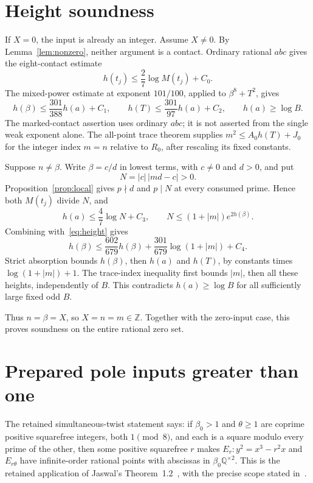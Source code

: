 \documentclass[11pt,a4paper]{article}
\newcommand{\Q}{\mathbb Q}\newcommand{\Z}{\mathbb Z}
\begin{document}
\section{Height soundness}
If $X=0$, the input is already an integer. Assume $X\ne0$.
By Lemma~\ref{lem:nonzero}, neither argument is a contact.
Ordinary rational $abc$ gives the eight-contact estimate
\cite[Section~2]{Height}
\[
                 h(t_j)\le\frac27\log M(t_j)+C_0.
\]
The mixed-power estimate at exponent $101/100$, applied to
$\beta^8+T^2$, gives
\begin{equation}\label{eq:height}
 h(\beta)\le\frac{301}{388}h(a)+C_1,\qquad
 h(T)\le\frac{301}{97}h(a)+C_2,\qquad h(a)\ge\log B.
\end{equation}
The marked-contact assertion uses ordinary $abc$; it is not asserted
from the single weak exponent alone. The all-point trace theorem
\cite[Corollary~1.3]{Trace}
supplies $m^2\le A_0h(T)+J_0$ for the integer index $m=n$
relative to $R_0$, after rescaling its fixed constants.

Suppose $n\ne\beta$. Write $\beta=c/d$ in lowest terms,
with $c\ne0$ and $d>0$, and put
\[
                         N=|c|\,|md-c|>0.
\]
Proposition~\ref{prop:local} gives $p\nmid d$ and $p\mid N$ at
every consumed prime. Hence both $M(t_j)$ divide $N$, and
\[
 h(a)\le\frac47\log N+C_3,\qquad
 N\le(1+|m|)e^{2h(\beta)}.
\]
Combining with~\eqref{eq:height} gives
\[
 h(\beta)\le\frac{602}{679}h(\beta)
       +\frac{301}{679}\log(1+|m|)+C_4.
\]
Strict absorption bounds $h(\beta)$, then $h(a)$ and $h(T)$,
by constants times $\log(1+|m|)+1$. The trace-index inequality
first bounds $|m|$, then all these heights, independently of $B$.
This contradicts $h(a)\ge\log B$ for all sufficiently large fixed
odd $B$.

Thus $n=\beta=X$, so $X=n=m\in\Z$. Together with the
zero-input case, this proves soundness on the entire rational zero set.

\section{Prepared pole inputs greater than one}\label{sec:pole}
The retained simultaneous-twist statement says: if $\beta_0>1$
and $\theta\ge1$ are coprime positive squarefree integers, both
$1\pmod8$, and each is a square modulo every prime of the other,
then some positive squarefree $r$ makes
$E_r:y^2=x^3-r^2x$ and $E_{r\theta}$ have infinite-order rational
points with abscissas in $\beta_0\Q^{\times2}$.
This is the retained application of Jaswal's
Theorem~1.2~\cite{Jaswal}, with the precise scope stated in~\cite{Pole}.
\end{document}
